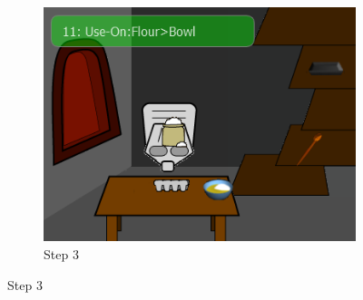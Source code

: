 \begin{figure}[ht]
	\centering
	\begin{subfigure}[b]{0.3\textwidth}
		\centering
		\includegraphics[width=\textwidth]{step3.png}
		\caption{Step 3}
		\label{fig:control_ingredients}
	\end{subfigure}
	

\end{figure}

